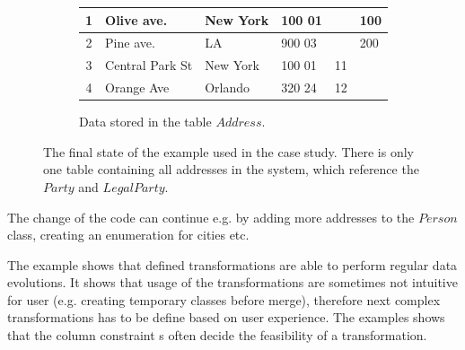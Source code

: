 \documentclass[runningheads]{comsis}
\begin{document}
\begin{figure}
\begin{subfigure}[b]{\textwidth}
\begin{tabular}{| c | l | l | l | l | l |}
		1 & Olive ave. & New York & 100 01 & & 100 \\ \hline
		2 & Pine ave. & LA & 900 03 & & 200  \\ \hline
		3 & Central Park St & New York & 100 01 & 11 &  \\ \hline
		4 & Orange Ave & Orlando & 320 24 & 12 &\\ \hline
	\end{tabular}
	\caption{Data stored in the table $Address$.}
\end{subfigure}
	\caption{The final state of the example used in the case study. There is only one table containing all addresses in the system, which reference the $Party$ and $LegalParty$.}
	\label{fig:case2}
\end{figure}
The change of the code can continue e.g. by adding more addresses to the $Person$ class, creating an enumeration for cities etc.

The example shows that defined transformations are able to perform regular data evolutions. It shows that usage of the transformations are sometimes not intuitive for user (e.g. creating temporary classes before merge), therefore next complex transformations has to be define based on user experience. The examples shows that the column constraint s often decide the feasibility of a transformation. 
\end{document}
